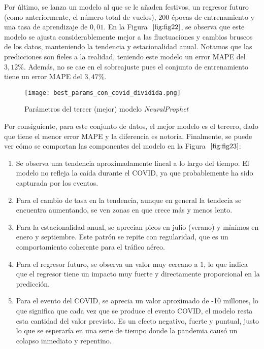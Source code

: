 \documentclass[12pt,twoside]{article}
\begin{document}
Por último, se lanza un modelo al que se le añaden festivos, un regresor futuro (como anteriormente, el número total de vuelos), 200 épocas de entrenamiento y una tasa de aprendizaje de $0,01$. En la Figura $~\ref{fig:fig22}$, se observa que este modelo se ajusta considerablemente mejor a las fluctuaciones y cambios bruscos de los datos, manteniendo la tendencia y estacionalidad anual. Notamos que las predicciones son fieles a la realidad, teniendo este modelo un error MAPE del $3,12\%$. Además, no se cae en el sobreajuste pues el conjunto de entrenamiento tiene un error MAPE del $3,47\%$.

\begin{figure}[h]
    \centering
    \texttt{[image: best\_params\_con\_covid\_dividida.png]}
    \caption{Parámetros del tercer (mejor) modelo \textit{NeuralProphet}} 
    \label{fig:fig23}
\end{figure}

Por consiguiente, para este conjunto de datos, el mejor modelo es el tercero, dado que tiene el menor error MAPE y la diferencia es notoria. Finalmente, se puede ver cómo se comportan las componentes del modelo en la Figura $~\ref{fig:fig23}$: 

\begin{enumerate}
    \item Se observa una tendencia aproximadamente lineal a lo largo del tiempo. El modelo no refleja la caída durante el COVID, ya que probablemente ha sido capturada por los eventos. 
    \item Para el cambio de tasa en la tendencia, aunque en general la tendecia se encuentra aumentando, se ven zonas en que crece más y menos lento.
    \item Para la estacionalidad anual, se aprecian picos en julio (verano) y mínimos en enero y septiembre. Este patrón se repite con regularidad, que es un comportamiento coherente para el tráfico aéreo. 
    \item Para el regresor futuro, se observa un valor muy cercano a 1, lo que indica que el regresor tiene un impacto muy fuerte y directamente proporcional en la predicción.
    \item Para el evento del COVID, se aprecia un valor aproximado de -10 millones, lo que significa que cada vez que se produce el evento COVID, el modelo resta esta cantidad del valor previsto. Es un efecto negativo, fuerte y puntual, justo lo que se esperaría en una serie de tiempo donde la pandemia causó un colapso inmediato y repentino.
\end{enumerate}
\end{document}
